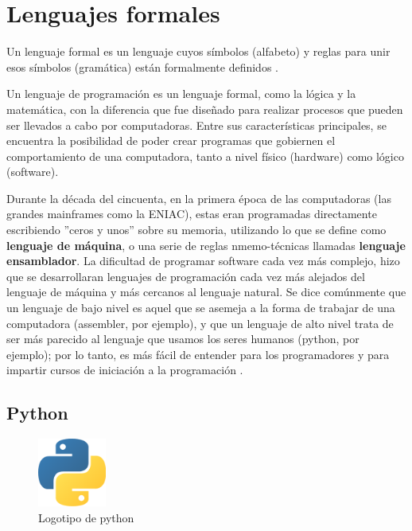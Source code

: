 \section{Lenguajes formales}

Un lenguaje formal es un lenguaje cuyos símbolos (alfabeto) y reglas para unir esos símbolos (gramática) están formalmente definidos \citep{giro_lenguaje_2015}.

Un lenguaje de programación es un lenguaje formal, como la lógica y la matemática, con la diferencia que fue diseñado para realizar procesos que pueden ser llevados a cabo por computadoras. Entre sus características principales, se encuentra la posibilidad de poder crear programas que gobiernen el comportamiento de una computadora, tanto a nivel físico (hardware) como lógico (software).

Durante la década del cincuenta, en la primera época de las computadoras (las grandes mainframes como la ENIAC), estas eran programadas directamente escribiendo ''ceros y unos'' sobre su memoria, utilizando lo que se define como \textbf{lenguaje de máquina}, o una serie de reglas nmemo-técnicas llamadas \textbf{lenguaje ensamblador}. La dificultad de programar software cada vez más complejo, hizo que se desarrollaran lenguajes de programación cada vez más alejados del lenguaje de máquina y más cercanos al lenguaje natural. Se dice comúnmente que un lenguaje de bajo nivel es aquel que se asemeja a la forma de trabajar de una computadora (assembler, por ejemplo), y que un lenguaje de alto nivel trata de ser más parecido al lenguaje que usamos los seres humanos (python, por ejemplo); por lo tanto, es más fácil de entender para los programadores y para impartir cursos de iniciación a la programación \citep{de2016introduccion}.

\subsection{Python}


\begin{figure}[htb]
  \begin{center}
    \includegraphics[width=0.2\textwidth]{figuras/Python-logo.png}
    \caption[Caption for LOF]{Logotipo de python}
    
    \label{fig:python_logo}
  \end{center}
\end{figure}

